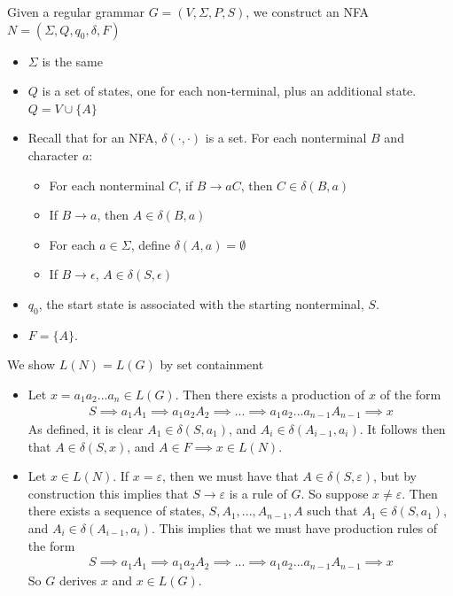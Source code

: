 \documentclass[11pt]{article}
\begin{document}
Given a regular grammar $G = (V,\Sigma, P , S)$, we construct an NFA $N = (\Sigma, Q, q_0, \delta, F)$
\begin{itemize}
    \item $\Sigma$ is the same
    \item $Q$ is a set of states, one for each non-terminal, plus an additional state. $Q = V \cup \{A\}$
    \item Recall that for an NFA, $\delta(\cdot, \cdot)$ is a set. For each nonterminal $B$ and character $a$:
    \begin{itemize}
        \item For each nonterminal $C$, if $B \rightarrow aC$, then $C \in \delta(B,a)$
        \item If $B \rightarrow a$, then $A \in \delta(B,a)$
        \item For each $a \in \Sigma$, define $\delta(A,a) = \emptyset$
        \item If $B \rightarrow \epsilon$, $A \in \delta(S, \epsilon)$
    \end{itemize}
    \item $q_0$, the start state is associated with the starting nonterminal, $S$. 
    \item $F = \{A\}$. 
\end{itemize}
We show $L(N) = L(G)$ by set containment
\begin{itemize}
    \item[$(L(G) \subseteq L(N))$] Let $x = a_1a_2...a_n \in L(G)$. Then there exists a production of $x$ of the form \begin{align}
        S \implies a_1A_1 \implies a_1a_2A_2 \implies ... \implies a_1a_2...a_{n-1}A_{n-1} \implies x
    \end{align} As defined, it is clear $A_1 \in \delta(S,a_1)$, and $A_i \in \delta(A_{i-1},a_i)$. It follows then that $A \in \delta(S,x)$, and $A \in F \implies x \in L(N)$. 
    \item[$(L(N) \subseteq L(G))$] Let $x \in L(N)$. If $x = \varepsilon$, then we must have that $A \in \delta(S, \varepsilon)$, but by construction this implies that $S \rightarrow \varepsilon$ is a rule of $G$. So suppose $x \neq \varepsilon$. Then there exists a sequence of states, $S, A_1, ..., A_{n-1}, A$ such that $A_1 \in \delta(S, a_1)$, and $A_i \in \delta(A_{i-1},a_i)$. This implies that we must have production rules of the form \begin{align}
        S \implies a_1A_1 \implies a_1a_2A_2 \implies ... \implies a_1a_2...a_{n-1}A_{n-1} \implies x
    \end{align} So $G$ derives $x$ and $x \in L(G)$. 
\end{itemize}
\end{document}
